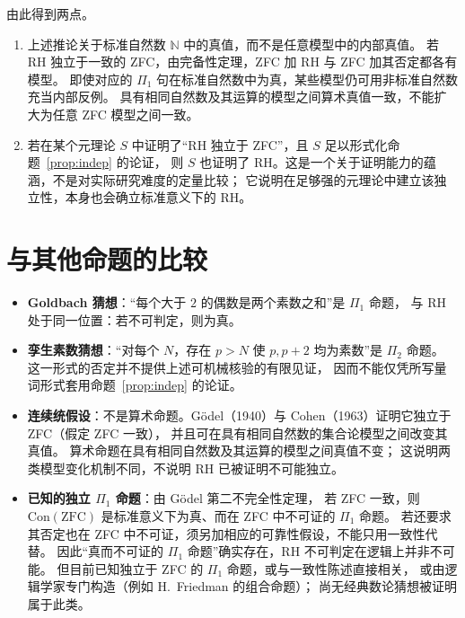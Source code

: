 \documentclass[11pt]{article}
\begin{document}
由此得到两点。
\begin{enumerate}
 \item 上述推论关于标准自然数 $\mathbb N$ 中的真值，而不是任意模型中的内部真值。
 若 RH 独立于一致的 ZFC，由完备性定理，ZFC 加 RH 与 ZFC 加其否定都各有模型。
 即使对应的 $\Pi_1$ 句在标准自然数中为真，某些模型仍可用非标准自然数充当内部反例。
 具有相同自然数及其运算的模型之间算术真值一致，不能扩大为任意 ZFC 模型之间一致。
 \item 若在某个元理论 $S$ 中证明了“RH 独立于 ZFC”，且 $S$ 足以形式化命题~\ref{prop:indep} 的论证，
 则 $S$ 也证明了 RH。这是一个关于证明能力的蕴涵，不是对实际研究难度的定量比较；
 它说明在足够强的元理论中建立该独立性，本身也会确立标准意义下的 RH。
\end{enumerate}

\section{与其他命题的比较}
\begin{itemize}
 \item \textbf{Goldbach 猜想}：“每个大于 $2$ 的偶数是两个素数之和”是 $\Pi_1$ 命题，
 与 RH 处于同一位置：若不可判定，则为真。
 \item \textbf{孪生素数猜想}：“对每个 $N$，存在 $p>N$ 使 $p,p+2$ 均为素数”是 $\Pi_2$ 命题。
 这一形式的否定并不提供上述可机械核验的有限见证，
 因而不能仅凭所写量词形式套用命题~\ref{prop:indep} 的论证。
 \item \textbf{连续统假设}：不是算术命题。Gödel（1940）与 Cohen（1963）证明它独立于 ZFC（假定 ZFC 一致），
 并且可在具有相同自然数的集合论模型之间改变其真值。
 算术命题在具有相同自然数及其运算的模型之间真值不变；
 这说明两类模型变化机制不同，不说明 RH 已被证明不可能独立。
 \item \textbf{已知的独立 $\Pi_1$ 命题}：由 Gödel 第二不完全性定理，
 若 ZFC 一致，则 $\mathrm{Con}(\mathrm{ZFC})$ 是标准意义下为真、而在 ZFC 中不可证的 $\Pi_1$ 命题。
 若还要求其否定也在 ZFC 中不可证，须另加相应的可靠性假设，不能只用一致性代替。
 因此“真而不可证的 $\Pi_1$ 命题”确实存在，RH 不可判定在逻辑上并非不可能。
 但目前已知独立于 ZFC 的 $\Pi_1$ 命题，或与一致性陈述直接相关，
 或由逻辑学家专门构造（例如 H.\ Friedman 的组合命题）；
 尚无经典数论猜想被证明属于此类。
\end{itemize}
\end{document}
